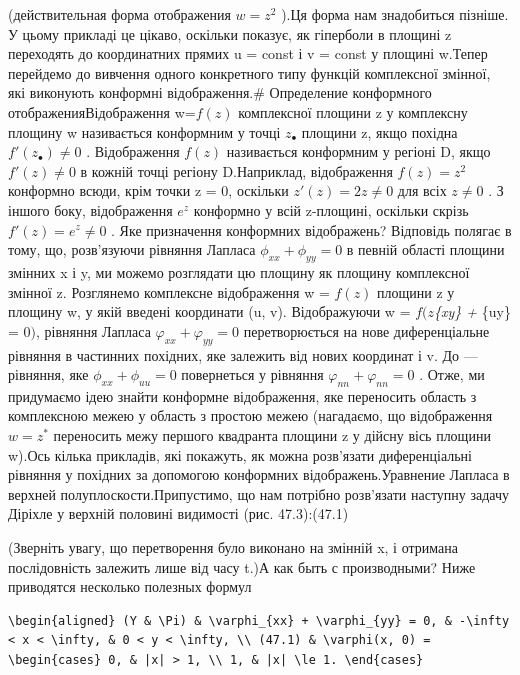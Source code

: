 \documentclass[
  ukrainian,
]{article}
\begin{document}
(действительная форма отображения \(w=z^2\) ).Ця форма нам знадобиться
пізніше. У цьому прикладі це цікаво, оскільки показує, як гіперболи в
площині z переходять до координатних прямих u = const і v = const у
площині w.Тепер перейдемо до вивчення одного конкретного типу функцій
комплексної змінної, які виконують конформні відображення.\# Определение
конформного отображенияВідображення w=\(f(z)\) комплексної площини z у
комплексну площину w називається конформним у точці \(z_{\bullet}\)
площини z, якщо похідна \(f'(z_{\bullet}) \neq 0\) . Відображення
\(f(z)\) називається конформним у регіоні D, якщо \(f'(z) \neq 0\) в
кожній точці регіону D.Наприклад, відображення \(f(z) = z^2\) конформно
всюди, крім точки z = 0, оскільки \(z'(z) = 2z \neq 0\) для всіх
\(z \neq 0\) . З іншого боку, відображення \(e^z\) конформно у всій
z-площині, оскільки скрізь \(f'(z) = e^z \neq 0\) . Яке призначення
конформних відображень? Відповідь полягає в тому, що, розв'язуючи
рівняння Лапласа \(\phi_{xx} + \phi_{yy} = 0\) в певній області площини
змінних x і y, ми можемо розглядати цю площину як площину комплексної
змінної z. Розглянемо комплексне відображення w = \(f(z)\) площини z у
площину w, у якій введені координати (u, v). Відображуючи w =
\(f(z\)\phi\emph{\{xy\} + \phi}\{uy\} = 0\()\), рівняння Лапласа
\(\varphi_{xx} + \varphi_{yy} = 0\) перетворюється на нове
диференціальне рівняння в частинних похідних, яке залежить від нових
координат і v. До --- рівняння, яке \(\phi_{xx} + \phi_{uu} = 0\)
повернеться у рівняння \(\varphi_{nn} + \varphi_{nn} = 0\) . Отже, ми
придумаємо ідею знайти конформне відображення, яке переносить область з
комплексною межею у область з простою межею (нагадаємо, що відображення
\(w=z^*\) переносить межу першого квадранта площини z у дійсну вісь
площини w).Ось кілька прикладів, які покажуть, як можна розв'язати
диференціальні рівняння у похідних за допомогою конформних
відображень.Уравнение Лапласа в верхней полуплоскости.Припустимо, що нам
потрібно розв'язати наступну задачу Діріхле у верхній половині видимості
(рис. 47.3):(47.1)

(Зверніть увагу, що перетворення було виконано на змінній x, і отримана
послідовність залежить лише від часу t.)А как быть с производными? Ниже
приводятся несколько полезных формул

\begin{verbatim}
\begin{aligned} (Y & \Pi) & \varphi_{xx} + \varphi_{yy} = 0, & -\infty < x < \infty, & 0 < y < \infty, \\ (47.1) & \varphi(x, 0) = \begin{cases} 0, & |x| > 1, \\ 1, & |x| \le 1. \end{cases}
\end{verbatim}
\end{document}
